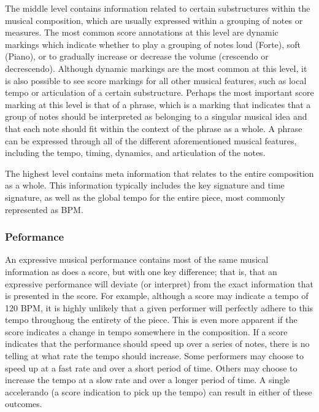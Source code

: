 The middle level contains information related to certain substructures within the musical composition, which are usually expressed within a grouping of notes or measures. The most common score annotations at this level are dynamic markings which indicate whether to play a grouping of notes loud (Forte), soft (Piano), or to gradually increase or decrease the volume (crescendo or decrescendo). %
Although dynamic markings are the most common at this level, it is also possible to see score markings for all other musical features, such as local tempo or articulation of a certain substructure. Perhaps the most important score marking at this level is that of a phrase, which is a marking that indicates that a group of notes should be interpreted as belonging to a singular musical idea and that each note should fit within the context of the phrase as a whole. A phrase can be expressed through all of the different aforementioned musical features, including the tempo, timing, dynamics, and articulation of the notes.

The highest level contains meta information that relates to the entire composition as a whole. This information typically includes the key signature and time signature, as well as the global tempo for the entire piece, most commonly represented as BPM. 

\subsubsection{Peformance}
An expressive musical performance contains most of the same musical information as does a score, but with one key difference; that is, that an expressive performance will deviate (or interpret) from the exact information that is presented in the score. For example, although a score may indicate a tempo of 120 BPM, it is highly unlikely that a given performer will perfectly adhere to this tempo throughoug the entirety of the piece. This is even more apparent if the score indicates a change in tempo somewhere in the composition. If a score indicates that the performance should speed up over a series of notes, there is no telling at what rate the tempo should increase. Some performers may choose to speed up at a fast rate and over a short period of time. Others may choose to increase the tempo at a slow rate and over a longer period of time. A single accelerando (a score indication to pick up the tempo) can result in either of these outcomes. 

